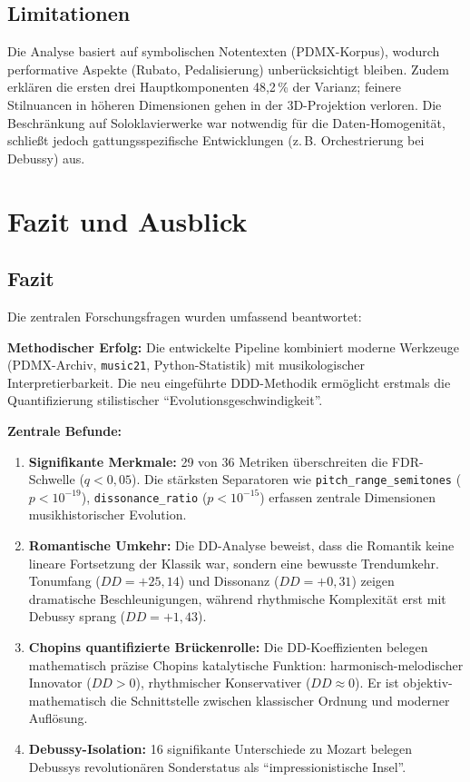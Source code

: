 \documentclass[10pt,a4paper]{article}
\theoremstyle{definition}
\begin{document}
\subsection{Limitationen}
Die Analyse basiert auf symbolischen Notentexten (PDMX-Korpus), wodurch performative Aspekte (Rubato, Pedalisierung) unberücksichtigt bleiben. Zudem erklären die ersten drei Hauptkomponenten 48,2\,\% der Varianz; feinere Stilnuancen in höheren Dimensionen gehen in der 3D-Projektion verloren. Die Beschränkung auf Soloklavierwerke war notwendig für die Daten-Homogenität, schließt jedoch gattungsspezifische Entwicklungen (z.\,B. Orchestrierung bei Debussy) aus.

\section{Fazit und Ausblick}
\subsection{Fazit}
Die zentralen Forschungsfragen wurden umfassend beantwortet:

\textbf{Methodischer Erfolg:} Die entwickelte Pipeline kombiniert moderne Werkzeuge (PDMX-Archiv, \texttt{music21}, Python-Statistik) mit musikologischer Interpretierbarkeit. Die neu eingeführte DDD-Methodik ermöglicht erstmals die Quantifizierung stilistischer \enquote{Evolutionsgeschwindigkeit}.

\textbf{Zentrale Befunde:}
\begin{enumerate}
    \item \textbf{Signifikante Merkmale:} 29 von 36 Metriken überschreiten die FDR-Schwelle ($q<0{,}05$). Die stärksten Separatoren wie \texttt{pitch\_range\_semitones} ($p<10^{-19}$), \texttt{dissonance\_ratio} ($p<10^{-15}$) erfassen zentrale Dimensionen musikhistorischer Evolution.
    
    \item \textbf{Romantische Umkehr:} Die DD-Analyse beweist, dass die Romantik keine lineare Fortsetzung der Klassik war, sondern eine bewusste Trendumkehr. Tonumfang ($DD = +25{,}14$) und Dissonanz ($DD = +0{,}31$) zeigen dramatische Beschleunigungen, während rhythmische Komplexität erst mit Debussy sprang ($DD = +1{,}43$).
    
    \item \textbf{Chopins quantifizierte Brückenrolle:} Die DD-Koeffizienten belegen mathematisch präzise Chopins katalytische Funktion: harmonisch-melodischer Innovator ($DD > 0$), rhythmischer Konservativer ($DD \approx 0$). Er ist objektiv-mathematisch die Schnittstelle zwischen klassischer Ordnung und moderner Auflösung.
    
    \item \textbf{Debussy-Isolation:} 16 signifikante Unterschiede zu Mozart belegen Debussys revolutionären Sonderstatus als \enquote{impressionistische Insel}.
\end{enumerate}
\end{document}
